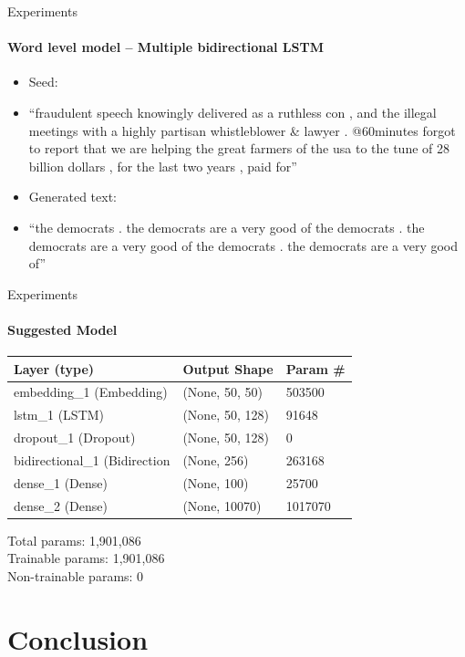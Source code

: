 \documentclass{beamer}
\begin{document}
\begin{frame}{Experiments}
\framesubtitle{Word level model -- Multiple bidirectional LSTM}
\begin{itemize}
\item Seed:
\item[] ``fraudulent speech knowingly delivered as a ruthless con , and the illegal meetings with a highly partisan whistleblower \& lawyer . @60minutes forgot to report that we are helping the great farmers of the usa to the tune of 28 billion dollars , for the last two years , paid for''
\vspace{5mm}
\item Generated text:
\item[] ``the democrats . the democrats are a very good of the democrats . the democrats are a very good of the democrats . the democrats are a very good of''
\end{itemize}
\end{frame}

\begin{frame}{Experiments}
\framesubtitle{Suggested Model}
\begin{center}
\begin{tabular}{l l l}
\hline
Layer (type) & Output Shape & Param \#\\
\hline
\hline
embedding\_1 (Embedding) & (None, 50, 50) & 503500\\
\hline
lstm\_1 (LSTM) & (None, 50, 128) & 91648\\
\hline
dropout\_1 (Dropout) & (None, 50, 128) & 0\\
\hline
bidirectional\_1 (Bidirection & (None, 256) & 263168\\
\hline
dense\_1 (Dense) & (None, 100) & 25700\\
\hline
dense\_2 (Dense) & (None, 10070) & 1017070\\
\hline
\hline
\end{tabular}
\begin{flushleft}
\hspace{8mm}
\parbox[b]{0.5\paperwidth}{
Total params: 1,901,086\\
Trainable params: 1,901,086\\
Non-trainable params: 0}
\end{flushleft}
\end{center}
\end{frame}

\section{Conclusion}
\end{document}
